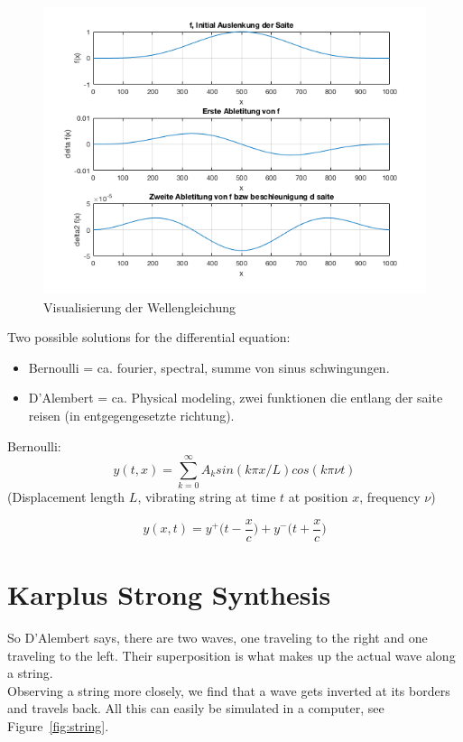 \begin{figure}[H]
  \begin{center}
    \includegraphics[width = 14cm]{img/wellengleichungVis.png}
    \caption{Visualisierung der Wellengleichung}
    \label{fig:wellengleichung}
  \end{center}
\end{figure}




Two possible solutions for the differential equation:
\begin{itemize}
	\item Bernoulli = ca. fourier, spectral, summe von sinus schwingungen.
	\item D'Alembert = ca. Physical modeling, zwei funktionen die entlang der saite reisen (in entgegengesetzte richtung).
\end{itemize}

Bernoulli:
\begin{equation}
  y(t,x) = \sum^{\infty}_{k=0} A_k sin(k\pi x/L)cos(k\pi \nu t)
\end{equation}
(Displacement length $L$, vibrating string at time $t$ at position $x$, frequency $\nu$)

\begin{equation}
y(x, t) = y ^+ \Bigg(t - \frac{x}{c}\Bigg) + y^- \Bigg(t + \frac{x}{c} \Bigg)
\end{equation}

\section{Karplus Strong Synthesis}
So D'Alembert says, there are two waves, one traveling to the right and one traveling to the left. Their superposition is what makes up the actual wave along a string. \\
Observing a string more closely, we find that a wave gets inverted at its borders and travels back.
All this can easily be simulated in a computer, see Figure~\ref{fig:string}.


